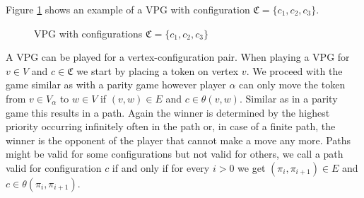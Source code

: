 \begin{example}
	Figure \ref{fig:vpg_basicex} shows an example of a VPG with configuration $\mathfrak{C} = \{c_1,c_2,c_3\}$.
	\begin{figure}[h]
		\centering
		\caption{VPG with configurations $\mathfrak{C} = \{c_1,c_2,c_3\}$}
		\label{fig:vpg_basicex}
	\end{figure}
\end{example}

A VPG can be played for a vertex-configuration pair. When playing a VPG for $v\in V$ and $c \in \mathfrak{C}$ we start by placing a token on vertex $v$. We proceed with the game similar as with a parity game however player $\alpha$ can only move the token from $v \in V_\alpha$ to $w \in V$ if $(v,w) \in E$ and $c \in \theta(v,w)$. Similar as in a parity game this results in a path. Again the winner is determined by the highest priority occurring infinitely often in the path or, in case of a finite path, the winner is the opponent of the player that cannot make a move any more. Paths might be valid for some configurations but not valid for others, we call a path valid for configuration $c$ if and only if for every $i > 0$ we get $(\pi_{i},\pi_{i+1}) \in E$ and $c \in \theta(\pi_{i},\pi_{i+1})$.

